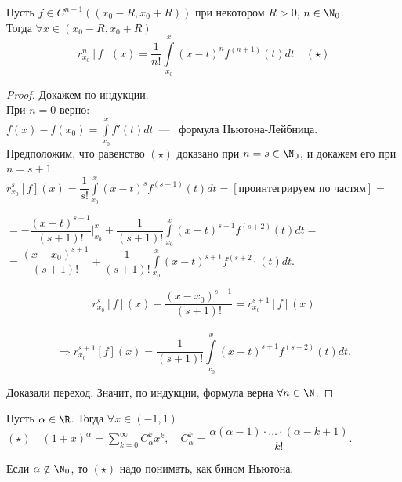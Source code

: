 \begin{theorem}
    Пусть $f \in C^{n+1}\left((x_0 - R, x_0 + R)\right)$ при некотором $R > 0$, $n \in \N_0$. \\
    Тогда $\forall x \in (x_0 - R, x_0 + R)$
    $$r_{x_0}^n[f](x) = \dfrac{1}{n!} \int \limits_{x_0}^{x}(x - t)^n f^{(n+1)} (t) dt \quad (\star)$$
\end{theorem}

\begin{proof}
    Докажем по индукции. \\
    При $n = 0$ верно: \\
    $f(x) - f(x_0) = \int \limits_{x_0}^x f'(t) dt$~---~ формула Ньютона-Лейбница. \\
    Предположим, что равенство $(\star)$ доказано при $n = s \in \N_0$, и докажем его при $n = s+1$. \\
        $r_{x_0}^s[f](x) = \dfrac{1}{s!} \int \limits_{x_0}^x (x-t)^s f^{(s+1)} (t) dt = [\text{проинтегрируем по частям}] =$ \\
        \begin{flushright} 
         $ = - \dfrac{(x-t)^{s+1}}{(s+1)!} \bigg|_{x_0}^x + \dfrac{1}{(s+1)!} \int \limits_{x_0}^x (x - t)^{s+1} f^{(s+2)} (t) dt = $ \\
         $ = \dfrac{(x - x_0) ^ {s+1}}{(s+1)!} + \dfrac{1}{(s+1)!} \int \limits_{x_0}^x (x-t)^{s+1} f^{(s+2)} (t) dt. $
        \end{flushright} 
        $$r_{x_0}^s[f](x) - \dfrac{(x-x_0)^{s+1}}{(s+1)!} = r_{x_0}^{s+1} [f] (x) $$ \\
        $$ \Longrightarrow r_{x_0}^{s+1} [f] (x) = \dfrac{1}{(s+1)!} \int \limits_{x_0}^x (x-t)^{s+1} f^{(s+2)} (t) dt. $$
    
    Доказали переход. Значит, по индукции, формула верна $\forall n \in \N$.
\end{proof}

\begin{theorem}
    Пусть $\alpha \in \R$. Тогда $\forall x \in (-1, 1)$ \\
    $(\star) \quad (1+x)^{\alpha} = \sum \limits_{k=0}^{\infty} C_{\alpha}^k x^k, \quad C_{\alpha}^k = \dfrac{\alpha(\alpha - 1) \cdot \dots \cdot (\alpha - k + 1)}{k!}$.

\end{theorem}

\begin{remark}
        Если $\alpha \notin \N_0$, то $(\star)$ надо понимать, как бином Ньютона.
\end{remark}

